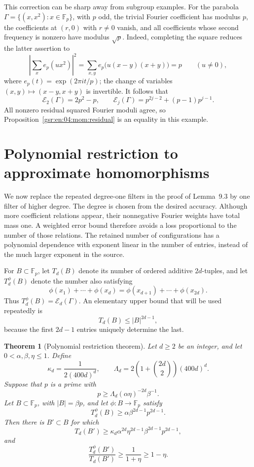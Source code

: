 \documentclass[11pt,letterpaper]{article}
\numberwithin{equation}{section}
\newtheorem{theorem}{Theorem}[section]
\theoremstyle{definition}
\theoremstyle{remark}
\newcommand{\F}{\mathbb F}
\newcommand{\1}{\mathbf 1}
\newcommand{\abs}[1]{\left|#1\right|}
\newcommand{\srctag}[1]{\texorpdfstring{\enspace\textup{[#1]}}{ [#1]}}
\newcommand{\srcnote}[2]{\par\noindent{\small\textit{Source #1, delivered #2.}}\par}
\begin{document}
This correction can be sharp away from subgroup examples.
For the parabola
\(\Gamma=\{(x,x^2):x\in\F_p\}\), with \(p\) odd, the trivial
Fourier coefficient has modulus \(p\), the coefficients at
\((r,0)\) with \(r\ne0\) vanish, and all coefficients whose
second frequency is nonzero have modulus \(\sqrt p\).
Indeed, completing the square reduces the latter assertion to
\[
 \abs{\sum_x e_p(ux^2)}^2
 =\sum_{x,y}e_p\bigl(u(x-y)(x+y)\bigr)=p
 \qquad(u\ne0),
\]
where \(e_p(t)=\exp(2\pi i t/p)\); the change of variables
\((x,y)\mapsto(x-y,x+y)\) is invertible.  It follows that
\[
 \mathcal E_2(\Gamma)=2p^2-p,\qquad
 \mathcal E_j(\Gamma)=p^{2j-2}+(p-1)p^{j-1}.
 \tag{M7}
\]
All nonzero residual squared Fourier moduli agree, so
Proposition~\ref{gsr:en:04:mom:residual} is an equality in this example.

\section[{Polynomial restriction to approximate homomorphisms\srctag{04}}]{Polynomial restriction to approximate homomorphisms}\label{gsr:en:04:sec:d4}
\srcnote{04}{Section 4}
\label{gsr:en:04:rest:section}

We now replace the repeated degree-one filters in the proof of
Lemma~9.3 by one filter of higher degree.  The degree is chosen
from the desired accuracy.  Although more coefficient relations
appear, their nonnegative Fourier weights have total mass one.
A weighted error bound therefore avoids a loss proportional to
the number of those relations.  The retained number of
configurations has a polynomial dependence with exponent
linear in the number of entries, instead of the much larger
exponent in the source.

For \(B\subset\F_p\), let \(T_d(B)\) denote its number of ordered
additive \(2d\)-tuples, and let \(T_d^\phi(B)\) denote the number
also satisfying
\[
 \phi(x_1)+\cdots+\phi(x_d)
   =\phi(x_{d+1})+\cdots+\phi(x_{2d}).
 \tag{R1}
\]
Thus \(T_d^\phi(B)=\mathcal E_d(\Gamma)\).  An elementary upper
bound that will be used repeatedly is
\[
 T_d(B)\leq\abs B^{2d-1},
 \tag{R2}
\]
because the first \(2d-1\) entries uniquely determine the last.

\begin{theorem}[Polynomial restriction theorem]
\label{gsr:en:04:rest:main}
Let \(d\geq2\) be an integer, and let \(0<\alpha,\beta,\eta\leq1\).
Define
\[
 \kappa_d=\frac{1}{2(400d)^d},
 \qquad
 \Lambda_d=2\left(1+\binom{2d}{2}\right)(400d)^d.
 \tag{R3}
\]
Suppose that \(p\) is a prime with
\[
 p\geq
 \Lambda_d(\alpha\eta)^{-2d}\beta^{-1}.
 \tag{R4}
\]
Let \(B\subset\F_p\), with \(\abs B=\beta p\), and let
\(\phi:B\to\F_p\) satisfy
\[
 T_d^\phi(B)\geq
       \alpha\beta^{2d-1}p^{2d-1}.
 \tag{R5}
\]
Then there is \(B'\subset B\) for which
\[
 \boxed{\quad
 T_d(B')\geq
 \kappa_d\alpha^{2d}\eta^{2d-1}
                  \beta^{2d-1}p^{2d-1},
 \quad}
 \tag{R6}
\]
and
\[
 \frac{T_d^\phi(B')}{T_d(B')}
       \geq\frac1{1+\eta}\geq1-\eta.
 \tag{R7}
\]
\end{theorem}
\end{document}

